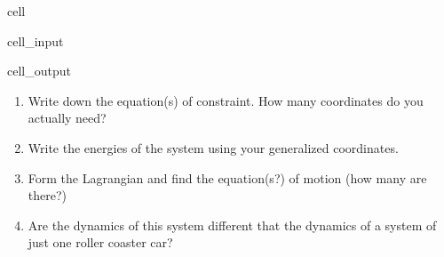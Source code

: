 \documentclass[letterpaper,10pt,english]{jupyterBook}
\begin{document}
\begin{sphinxuseclass}{cell}
\begin{sphinxVerbatimInput}
\begin{sphinxuseclass}{cell_input}
\end{sphinxuseclass}\end{sphinxVerbatimInput}
\begin{sphinxVerbatimOutput}

\begin{sphinxuseclass}{cell_output}
\noindent{}

\end{sphinxuseclass}\end{sphinxVerbatimOutput}

\end{sphinxuseclass}
\sphinxAtStartPar
{}
\begin{enumerate}
%
\item {} 
\sphinxAtStartPar
Write down the equation(s) of constraint. How many coordinates do you actually need?

\item {} 
\sphinxAtStartPar
Write the energies of the system using your generalized coordinates.

\item {} 
\sphinxAtStartPar
Form the Lagrangian and find the equation(s?) of motion (how many are there?)

\item {} 
\sphinxAtStartPar
Are the dynamics of this system different that the dynamics of a system of just one roller coaster car?

\end{enumerate}

\sphinxstepscope
\end{document}
